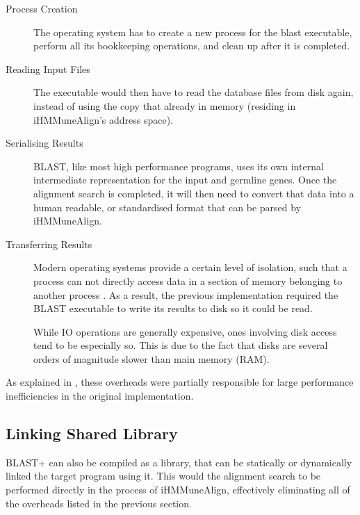\begin{description}
	\item[Process Creation]
	The operating system has to create a new process for the blast executable, perform all its bookkeeping operations, and clean up after it is completed.
	\item[Reading Input Files]
	The executable would then have to read the database files from disk again, instead of using the copy that already in memory (residing in iHMMuneAlign's address space).
	\item[Serialising Results]
	BLAST, like most high performance programs, uses its own internal intermediate representation for the input and germline genes\autocite{blast}. Once the alignment search is completed, it will then need to convert that data into a human readable, or standardised format that can be parsed by iHMMuneAlign.
	\item[Transferring Results]
    Modern operating systems provide a certain level of isolation, such that a process can not directly access data in a section of memory belonging to another process \autocite{address-spaces}. As a result, the previous implementation required the BLAST executable to write its results to disk so it could be read.
    
    While IO operations are generally expensive, ones involving disk access tend to be especially so. This is due to the fact that disks are several orders of magnitude slower than main memory (RAM).
\end{description}

As explained in , these overheads were partially responsible for large performance inefficiencies in the original implementation. 

\subsection{Linking Shared Library}
\label{sec:blast-lib}
BLAST+ can also be compiled as a library, that can be statically or dynamically linked the target program using it. This would the alignment search to be performed directly in the process of iHMMuneAlign, effectively eliminating all of the overheads listed in the previous section.

